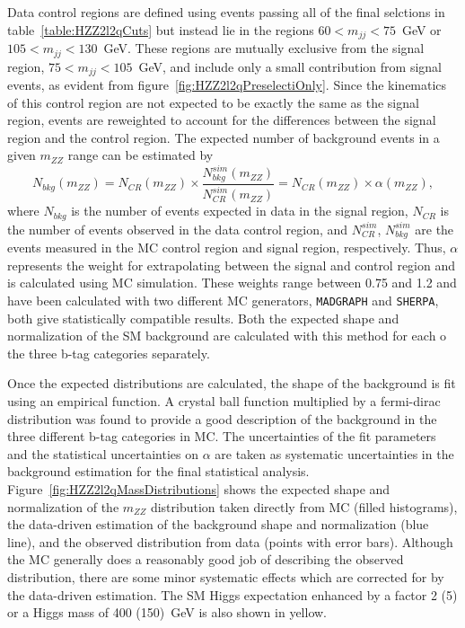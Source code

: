 Data control regions are defined using events passing all
of the final selctions in table~\ref{table:HZZ2l2qCuts} but instead
lie in the regions $60 < m_{jj} < 75$~GeV or $105 < m_{jj} < 130$~GeV. 
These regions are mutually exclusive from the signal region, 
$75<m_{jj}<105$~GeV, and include
only a small contribution from signal events, as evident from 
figure~\ref{fig:HZZ2l2qPreselectiOnly}.  Since the kinematics of
this control region are not expected to be exactly the same as 
the signal 
region, events are reweighted to account for the 
differences between the signal region and the control region. 
The expected number
of background events in a given $m_{ZZ}$ range can be estimated by
\begin{equation}
N_{bkg}(m_{ZZ}) = N_{CR}(m_{ZZ})\times\frac{N_{bkg}^{sim}(m_{ZZ})}{N_{CR}^{sim}(m_{ZZ})}=N_{CR}(m_{ZZ})\times\alpha(m_{ZZ}),
\label{eq:HZZ2l2qAlpha}
\end{equation}
where $N_{bkg}$ is the number of events expected in data in the 
signal region, $N_{CR}$ is the number of events observed in the
data control region, and $N_{CR}^{sim}$, $N_{bkg}^{sim}$ are the 
events measured in the MC control region and signal region, 
respectively.  Thus, $\alpha$ represents the weight for
extrapolating
between the signal and control region and is calculated using
MC simulation.
These weights range between 0.75 and 1.2 and have been calculated
with two different MC generators, 
{\verb+MADGRAPH+} and {\verb+SHERPA+}, 
both give statistically compatible results.  Both the expected 
shape and normalization of the SM background are calculated with
this method for each o the three b-tag categories separately.  

Once the expected distributions are calculated, the shape of the
background is fit using an empirical
function.  A crystal ball function multiplied by a fermi-dirac
distribution was found to provide a good description of the 
background in the three different b-tag categories in MC.
The uncertainties of the fit parameters and the statistical 
uncertainties on $\alpha$ are taken as systematic
uncertainties in the background estimation for the 
final statistical analysis.  
Figure~\ref{fig:HZZ2l2qMassDistributions} shows the expected 
shape and normalization of the $m_{ZZ}$ distribution
taken directly from MC (filled histograms), 
the data-driven estimation of the background shape and normalization
(blue line), and the observed distribution from data (points with 
error bars). Although
the MC generally does a reasonably good job of describing the 
observed distribution, there are some minor systematic effects which 
are corrected for by the data-driven estimation.  The SM Higgs
expectation enhanced by a factor 2 (5) or a Higgs mass of 400 (150)~GeV 
is also shown in yellow.  

